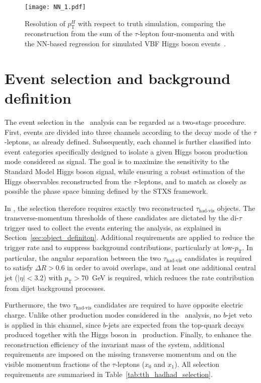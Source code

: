 \begin{figure}[htbp]
    \centering
    \texttt{[image: NN\_1.pdf]}
    \caption{Resolution of $p_{\text{T}}^{H}$ with respect to truth simulation, comparing the reconstruction from the sum of the $\tau$-lepton four-momenta and \etmiss with the NN-based regression for simulated VBF Higgs boson events~\cite{differential_htautau}.}
    \label{fig:ptH_resolution}
\end{figure}

\section{Event selection and background definition}
\label{sec:event_selection_background}

The event selection in the \htautau\ analysis can be regarded as a two-stage procedure. 
First, events are divided into three channels according to the decay mode of the $\tau$-leptons, as already defined. 
Subsequently, each channel is further classified into event categories specifically designed to isolate a given Higgs boson production mode considered as signal. 
The goal is to maximize the sensitivity to the Standard Model Higgs boson signal, while ensuring a robust estimation of the Higgs observables reconstructed from the $\tau$-leptons, and to match as closely as possible the phase space binning defined by the STXS framework.

In \ttHtt, the selection therefore requires exactly two reconstructed $\tau_{\text{had-vis}}$ objects. 
The transverse-momentum thresholds of these candidates are dictated by the di-$\tau$ trigger used to collect the events entering the analysis, as explained in Section~\ref{sec:object_definiton}. 
Additional requirements are applied to reduce the trigger rate and to suppress background contributions, particularly at low-$p_{\text{T}}$. 
In particular, the angular separation between the two $\tau_{\text{had-vis}}$ candidates is required to satisfy $\Delta R > 0.6$ in order to avoid overlaps, and at least one additional central jet ($|\eta| < 3.2$) with $p_{\text{T}} > 70$~GeV is required, which reduces the rate contribution from dijet background processes.

Furthermore, the two $\tau_{\text{had-vis}}$ candidates are required to have opposite electric charge. 
Unlike other production modes considered in the \htautau\ analysis, no $b$-jet veto is applied in this channel, since $b$-jets are expected from the top-quark decays produced together with the Higgs boson in \ttH\ production. 
Finally, to enhance the reconstruction efficiency of the invariant mass of the system, additional requirements are imposed on the missing transverse momentum \etmiss and on the visible momentum fractions of the $\tau$-leptons ($x_0$ and $x_1$). 
All selection requirements are summarised in Table~\ref{tab:tth_hadhad_selection}.

